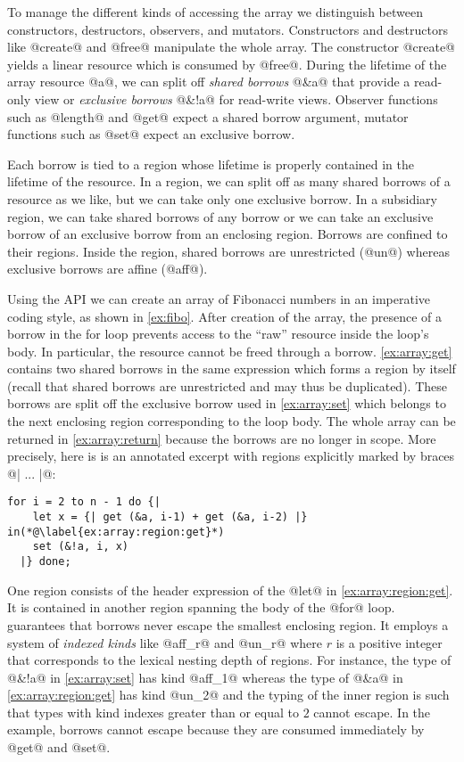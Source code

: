 To manage the different kinds of accessing the array we distinguish between constructors, destructors,
observers, and mutators.
Constructors and destructors like @create@ and @free@ manipulate the whole
array. %
The constructor
@create@ yields a linear resource which is consumed by @free@.
During the lifetime of the array resource @a@, we can split
off \emph{shared borrows} @&a@ that provide a read-only
view or \emph{exclusive borrows} @&!a@ for read-write views.
Observer functions such as @length@ and @get@ expect a shared borrow
argument, mutator functions such as @set@ expect
an exclusive borrow.

Each borrow is tied to a region whose lifetime is properly
contained in the lifetime of the resource.
In a region, we can split off as many shared borrows of a resource as
we like, but we can take only one exclusive borrow. In a
subsidiary region, we can take shared borrows of any
borrow or we can take an exclusive borrow of an exclusive borrow from an
enclosing region. Borrows are confined to their regions. Inside the region,
shared borrows are unrestricted (@un@) whereas exclusive
borrows are affine (@aff@).

Using the API 
we can create an
array of Fibonacci numbers in an imperative coding style, as shown
in \cref{ex:fibo}.
%
After
creation of the array, the presence of a borrow in the for loop
prevents access to the ``raw'' resource inside the loop's
body. In particular, the resource cannot be freed through a
borrow. \cref{ex:array:get} contains two shared borrows 
in the same expression which forms a region by itself (recall that
shared borrows are unrestricted and may thus be duplicated). These borrows
are split off the exclusive borrow used in \cref{ex:array:set} which
belongs to the next enclosing region corresponding to the loop body.
The whole array can be returned in \cref{ex:array:return} because  the
borrows are no longer in scope.
%
More precisely, here is is an annotated excerpt with regions explicitly
marked by braces @{| ... |}@:
\begin{lstlisting}[firstnumber=3]
  for i = 2 to n - 1 do {|
    let x = {| get (&a, i-1) + get (&a, i-2) |} in(*@\label{ex:array:region:get}*)
    set (&!a, i, x)
  |} done;
\end{lstlisting}

One region consists of the header expression of the @let@ in
\cref{ex:array:region:get}. It is contained in another region
spanning the body of the @for@ loop. \lang guarantees that borrows
never escape the smallest enclosing region. It employs a system of
\emph{indexed kinds} like @aff_r@ and @un_r@ where
$r$ is a positive integer that corresponds to the lexical nesting
depth of regions. For instance, the type of @&!a@ in
\cref{ex:array:set} has kind @aff_1@ whereas the type of
@&a@ in \cref{ex:array:region:get} has kind
@un_2@ and the typing of the inner region is such that types with
kind indexes greater than or equal to $2$ cannot escape.
In the example, borrows cannot escape  because they are consumed
immediately by @get@ and @set@.

